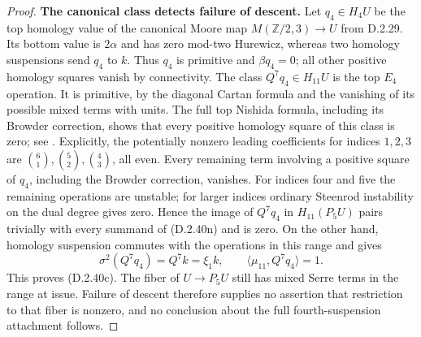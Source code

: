 \begin{proof}
\medskip\noindent
\textbf{The canonical class detects failure of descent.}
Let $q_4\in H_4U$ be the top homology value of the canonical
Moore map $M(\mathbb Z/2,3)\to U$ from D.2.29.
Its bottom value is $2\alpha$ and has zero mod-two Hurewicz,
whereas two homology suspensions send $q_4$ to $k$.
Thus $q_4$ is primitive and $\beta q_4=0$; all other positive
homology squares vanish by connectivity.
The class $Q^7q_4\in H_{11}U$ is the top $E_4$ operation.
It is primitive, by the diagonal Cartan formula and the
vanishing of its possible mixed terms with units.
The full top Nishida formula, including its Browder correction,
shows that every positive homology square of this class is zero;
see \cite[Chapter~III, Theorems~1.2--1.4,
pp.~216--219]{I_CohenLadaMay1976}.
Explicitly, the potentially nonzero leading coefficients for
indices $1,2,3$ are
$\binom61,\binom52,\binom43$, all even.
Every remaining term involving a positive square of $q_4$,
including the Browder correction, vanishes.  For indices four
and five the remaining operations are unstable; for larger
indices ordinary Steenrod instability on the dual degree gives
zero.  Hence the image of $Q^7q_4$ in $H_{11}(P_5U)$ pairs
trivially with every summand of \textup{(D.2.40n)} and is zero.
On the other hand, homology suspension commutes with the
operations in this range and gives
\[
 \sigma^2(Q^7q_4)=Q^7k=\xi_1k,
 \qquad \langle\mu_{11},Q^7q_4\rangle=1.
 \tag{D.2.40o}
\]
This proves \textup{(D.2.40c)}.
The fiber of $U\to P_5U$ still has mixed Serre terms in the
range at issue.  Failure of descent therefore supplies no
assertion that restriction to that fiber is nonzero, and no
conclusion about the full fourth-suspension attachment follows.
\end{proof}
